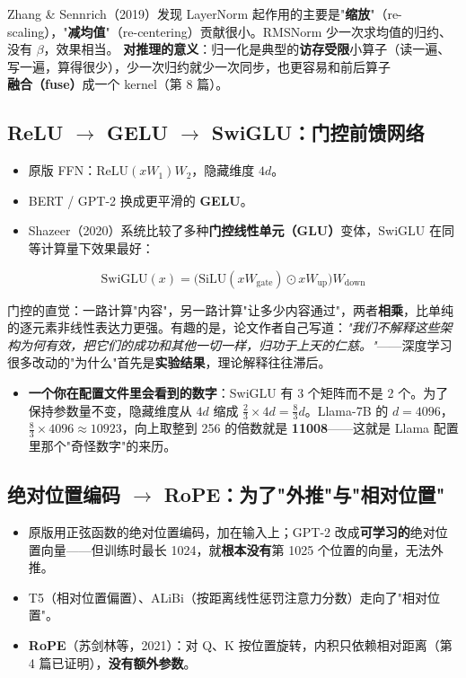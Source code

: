 Zhang \& Sennrich（2019）发现 LayerNorm 起作用的主要是"\textbf{缩放}"（re-scaling），"\textbf{减均值}"（re-centering）贡献很小。RMSNorm 少一次求均值的归约、没有 $\beta$，效果相当。
\textbf{对推理的意义}：归一化是典型的\textbf{访存受限}小算子（读一遍、写一遍，算得很少），少一次归约就少一次同步，也更容易和前后算子\textbf{融合（fuse）}成一个 kernel（第 8 篇）。

\subsection{ReLU \texorpdfstring{$\rightarrow$}{->} GELU \texorpdfstring{$\rightarrow$}{->} SwiGLU：门控前馈网络}

\begin{itemize}
  \item 原版 FFN：$\text{ReLU}(x W_1) W_2$，隐藏维度 $4d$。
  \item BERT / GPT-2 换成更平滑的 \textbf{GELU}。
  \item Shazeer（2020）系统比较了多种\textbf{门控线性单元（GLU）}变体，SwiGLU 在同等计算量下效果最好：
\end{itemize}

\[
\text{SwiGLU}(x) = \big(\text{SiLU}(x W_{\text{gate}}) \odot x W_{\text{up}}\big) W_{\text{down}}
\]

  门控的直觉：一路计算"内容"，另一路计算"让多少内容通过"，两者\textbf{相乘}，比单纯的逐元素非线性表达力更强。有趣的是，论文作者自己写道：\textit{"我们不解释这些架构为何有效，把它们的成功和其他一切一样，归功于上天的仁慈。"}——深度学习很多改动的"为什么"首先是\textbf{实验结果}，理论解释往往滞后。
\begin{itemize}
  \item \textbf{一个你在配置文件里会看到的数字}：SwiGLU 有 3 个矩阵而不是 2 个。为了保持参数量不变，隐藏维度从 $4d$ 缩成 $\frac{2}{3} \times 4d = \frac{8}{3}d$。Llama-7B 的 $d = 4096$，$\frac{8}{3} \times 4096 \approx 10923$，向上取整到 256 的倍数就是 \textbf{11008}——这就是 Llama 配置里那个"奇怪数字"的来历。
\end{itemize}

\subsection{绝对位置编码 \texorpdfstring{$\rightarrow$}{->} RoPE：为了"外推"与"相对位置"}

\begin{itemize}
  \item 原版用正弦函数的绝对位置编码，加在输入上；GPT-2 改成\textbf{可学习的}绝对位置向量——但训练时最长 1024，就\textbf{根本没有}第 1025 个位置的向量，无法外推。
  \item T5（相对位置偏置）、ALiBi（按距离线性惩罚注意力分数）走向了"相对位置"。
  \item \textbf{RoPE}（苏剑林等，2021）：对 Q、K 按位置旋转，内积只依赖相对距离（第 4 篇已证明），\textbf{没有额外参数}。
\end{itemize}

